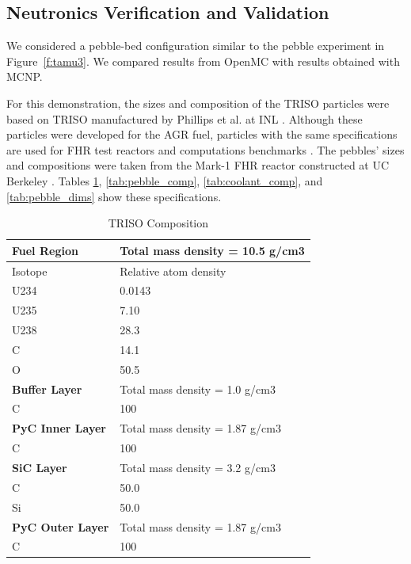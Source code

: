 \subsection{Neutronics Verification and Validation}

We considered a pebble-bed configuration similar to the pebble experiment in Figure~\ref{f:tamu3}.
We compared results from OpenMC with results obtained with MCNP.

For this demonstration, the sizes and composition of the TRISO particles were based on TRISO
manufactured by Phillips et al. at INL \cite{phillips2010}.  Although these particles were developed
for the AGR fuel, particles with the same specifications are used for FHR
test reactors and computations benchmarks \cite{charalampos2014}.  The pebbles' sizes and compositions were taken from the Mark-1 FHR reactor constructed at UC Berkeley
\cite{charalampos2014}.  Tables \ref{tab:triso_comp}, \ref{tab:pebble_comp},
\ref{tab:coolant_comp}, and \ref{tab:pebble_dims} show these specifications.

\begin{table}
  \centering
  \begin{tabular}{|ll|}
    \hline \hline
    \textbf{Fuel Region}	 & Total mass density = 10.5 g/cm3 \\
    \hline
    Isotope	     & Relative atom density \\
    U234	       & 0.0143 \\
    U235	       & 7.10 \\
    U238	       & 28.3 \\
    C	           & 14.1 \\
    O	           & 50.5 \\
    \hline \hline
    \textbf{Buffer Layer} & Total mass density = 1.0 g/cm3 \\
    \hline
    C	           & 100 \\
    \hline \hline
    \textbf{PyC Inner Layer}	   & Total mass density = 1.87 g/cm3 \\
    \hline
    C	           & 100 \\
    \hline \hline
    \textbf{SiC Layer}	   & Total mass density = 3.2 g/cm3 \\
    \hline
    C	           & 50.0 \\
    Si	         & 50.0 \\
    \hline \hline
    \textbf{PyC Outer Layer}	     & Total mass density = 1.87 g/cm3 \\
    \hline
    C	           & 100 \\
    \hline \hline
  \end{tabular}
  \caption{TRISO Composition}
  \label{tab:triso_comp}
\end{table}


